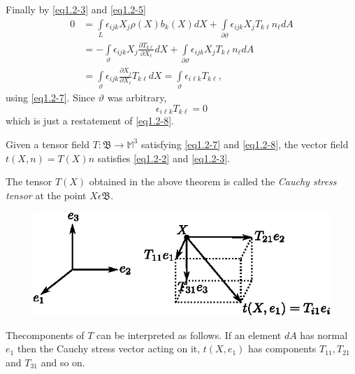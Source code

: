 Finally by \eqref{eq1.2-3} and \eqref{eq1.2-5}
\begin{align*}
0 & = \int\limits_L \epsilon_{ijk} X_j \rho(X)b_k(X) dX
+ \int\limits_{\partial\vartheta} \epsilon_{ijk} X_j T_{k\ell}
n_{\ell} dA\\ 
& = - \int\limits_{\vartheta} \epsilon_{ijk} X_j\frac{\partial
  T_{k \ell}}{\partial X_{\ell}} dX + \int\limits_{\partial\vartheta}
\epsilon_{ijk} X_j T_{k\ell} n_{\ell} dA\\ 
& = \int\limits_{\vartheta} \epsilon_{ijk} \frac{\partial
  X_j}{\partial X_\ell} T_{k\ell} dX = \int\limits_{\vartheta}
\epsilon_{i\ell k} T_{k\ell}, 
\end{align*}
using \eqref{eq1.2-7}. Since $\vartheta$ was arbitrary,
$$
\epsilon_{i\ell k} T_{k\ell} = 0
$$
which is just a restatement of \eqref{eq1.2-8}.

\begin{remark}\label{chap1-rem1.2.1}%
  Given a tensor field $T : \mathfrak{B} \rightarrow \mathbb{M}^3$
  satisfying \eqref{eq1.2-7} and \eqref{eq1.2-8}, 
the vector field $t(X,n) = T(X)n$
  satisfies \eqref{eq1.2-2} and \eqref{eq1.2-3}. 
\end{remark}

The tensor $T(X)$ obtained in the above theorem is called the
\textit{Cauchy stress tensor} at the point $X \epsilon
\mathfrak{B}$. 

\begin{figure}[H]
\centering
\includegraphics{vol71-figures/fig1.2-3.eps}
\caption{}\label{fig1.2.3}
\end{figure}

\begin{remark}\label{chap1-rem1.2.2}%
The\pageoriginale  components of $T$ can be interpreted as follows. If
an element 
$dA$ has normal $e_1$ then the Cauchy stress vector  acting on it, 
$t(X,e_1)$ has components $T_{11},T_{21}$ and $T_{31}$ and so on. 
\end{remark}

